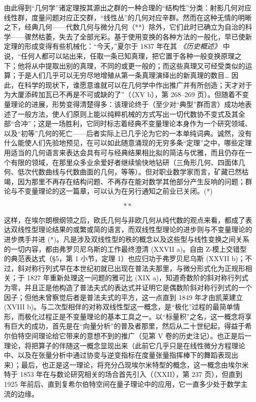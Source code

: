 由此得到“几何学”诸定理按其源出之群的一种合理的“结构性”分类：射影几何对应线性群，度量问题对应正交群，“线性丛”的几何对应辛群。然而在这种无情的明晰之下，经典几何——代数几何与微分几何（**）除外，它们此时已确立为自治的科学——骤然枯萎，失去了全部光彩。基于使用变换的各种方法的一般化，早已使新定理的形成变得有些机械化：“今天，”夏尔于 1837 年在其 \emph{《历史概述》} 中说，“任何人都可以站出来，任取一条已知真理，把它置于各种一般变换原理之下；他将从中提取出别的真理，不同的或更一般的；而这些真理又可经受类似的运算；于是人们几乎可以无穷尽地增殖从第一条真理演绎出的新真理的数目\ldots{} 因此，在科学的现状下，谁愿意谁就可以在几何学中作出推广并有所创造；天才对于为大厦添砖加瓦已不再是不可或缺的了”（（XV b），第 268–269 页）。但随着不变量理论的进展，形势变得清楚得多：该理论终于（至少对“典型”群而言）成功地表述了一般方法，使人们原则上能以纯粹机械的方式写出一切代数协不变式及其全部“合冲”；这是一场胜利，它同时标志着经典不变量理论本身作为一个研究领域、以及“初等”几何的死亡——后者实际上已几乎沦为它的一本单纯词典。诚然，没有什么能使人们先验地预见，在可以如此随意涌现的无穷多条“定理”之中，哪些定理用适当的几何语言来表达会具有可与经典结果相比拟的简洁与优雅，而且仍存在一个有限的领域，在那里众多业余爱好者继续愉快地钻研（三角形几何、四面体几何、低次代数曲线与代数曲面的几何，等等）。但对职业数学家而言，矿藏已然枯竭，因为那里不再存在结构问题、不再存在能对数学其他部分产生反响的问题；群论与不变量理论的这一篇章，可以认为在另行通知之前业已关闭。(*)

\[
\ast \ast
\]

这样，在埃尔朗根纲领之后，欧氏几何与非欧几何从纯代数的观点来看，都成了表达双线性型理论结果的或繁或简的语言，而双线性型理论的进步则与不变量理论的进步携手并进 (*)。凡是涉及双线性型的秩的概念以及这些型与线性变换之间关系的一切内容，都由弗罗贝尼乌斯的工作最终澄清 (XXVII a)。自由 Z-模上交错型的典范表达式（§5，第 1 小节，定理 1）也应归功于弗罗贝尼乌斯 (XXVII b)；不过，斜对称行列式早在本世纪初就已出现在普法夫那里，与微分形式化为正规形相关；于 1827 年重新处理这一问题的雅可比 (XIX a)，知道奇数阶的斜对称行列式为零，并且正是他构造了普法夫式的表达式并证明它是偶数阶斜对称行列式的一个因子；但他未曾察觉后者是普法夫式的平方，这一点直到 1849 年才由凯莱建立 (XVIII b)。与二次型相伴的对称双线性型这一概念，是“极化”过程的最简单情形，而极化过程正是不变量理论的基本工具之一。以“标量积”之名，这一概念将享有巨大的成功，首先是在“向量分析”的普及者那里，然后从二十世纪起，得益于希尔伯特空间理论给它带来的意想不到的推广（见第 V 卷的历史注记）。也正是后一理论，将把算子的伴随这一概念显现出来（此前它几乎只是在线性微分方程理论中、以及在张量分析中通过协变与逆变指标在度量张量指挥棒下的舞蹈表现出来）；最后，也正是这一理论，将充分凸现埃尔米特型的概念，这一概念由埃尔米特于 1853 年在与数论研究相关的场合首先引入（（XXII），第 237 页），但直到 1925 年前后、直到复希尔伯特空间在量子理论中的应用，它一直多少处于数学主流的边缘。

